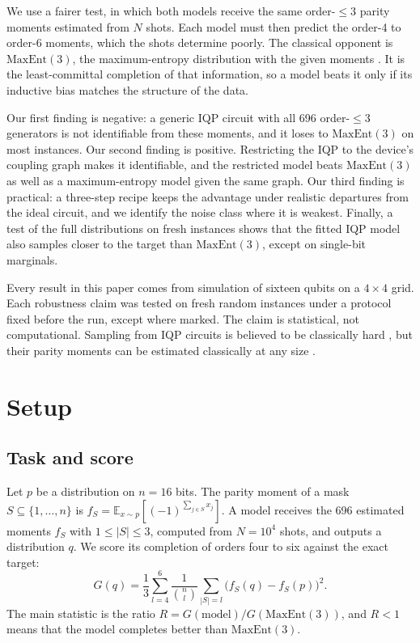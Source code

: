 \documentclass[aps,pra,twocolumn,superscriptaddress,nofootinbib]{revtex4-2}
\newcommand{\Gm}{G}
\newcommand{\ME}{\mathrm{MaxEnt}(3)}
\begin{document}
We use a fairer test, in which both models receive the same order-$\le 3$ parity moments estimated from $N$ shots.
Each model must then predict the order-4 to order-6 moments, which the shots determine poorly.
The classical opponent is $\ME$, the maximum-entropy distribution with the given moments \cite{jaynes1957information}.
It is the least-committal completion of that information, so a model beats it only if its inductive bias matches
the structure of the data.

Our first finding is negative: a generic IQP circuit with all 696 order-$\le 3$ generators is not identifiable from
these moments, and it loses to $\ME$ on most instances.
Our second finding is positive.
Restricting the IQP to the device's coupling graph makes it identifiable, and the restricted model beats $\ME$
as well as a maximum-entropy model given the same graph.
Our third finding is practical: a three-step recipe keeps the advantage under realistic departures from the ideal
circuit, and we identify the noise class where it is weakest.
Finally, a test of the full distributions on fresh instances shows that the fitted IQP model also samples closer to
the target than $\ME$, except on single-bit marginals.

Every result in this paper comes from simulation of sixteen qubits on a $4\times 4$ grid.
Each robustness claim was tested on fresh random instances under a protocol fixed before the run, except where
marked.
The claim is statistical, not computational.
Sampling from IQP circuits is believed to be classically hard \cite{bremner2011classical}, but their parity moments
can be estimated classically at any size \cite{recio2025train}.

\section{Setup}

\subsection{Task and score}

Let $p$ be a distribution on $n=16$ bits.
The parity moment of a mask $S\subseteq\{1,\dots,n\}$ is $f_S = \mathbb{E}_{x\sim p}[(-1)^{\sum_{j\in S} x_j}]$.
A model receives the 696 estimated moments $\hat f_S$ with $1\le |S|\le 3$, computed from $N=10^4$ shots, and
outputs a distribution $q$.
We score its completion of orders four to six against the exact target:
\begin{equation}
  \Gm(q) = \frac{1}{3}\sum_{l=4}^{6} \frac{1}{\binom{n}{l}} \sum_{|S|=l} \bigl(f_S(q) - f_S(p)\bigr)^2 .
\end{equation}
The main statistic is the ratio $R = \Gm(\text{model})/\Gm(\ME)$, and $R<1$ means that the model completes better
than $\ME$.
\end{document}

